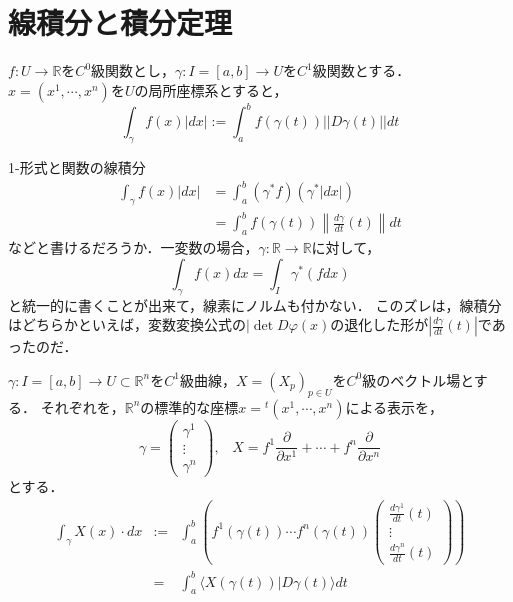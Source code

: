 \documentclass[uplatex, dvipdfmx]{jsreport}
\begin{document}
\section{線積分と積分定理}

\begin{definition}
    $f:U\to\mathbb{R}$を$C^0$級関数とし，$\gamma:I=[a,b]\to U$を$C^1$級関数とする．$x=(x^1,\cdots,x^n)$を$U$の局所座標系とすると，
    \[ \int_\gamma f(x)|dx|:=\int^b_af(\gamma(t))||D\gamma(t)||dt \]
    \begin{center}
    \end{center}
\end{definition}
\begin{itembox}[l]{1-形式と関数の線積分}
    \begin{align*}
        \int_\gamma f(x)|dx| &= \int^b_a(\gamma^*f)(\gamma^*|dx|) \\
        &= \int^b_a f(\gamma(t))\left\| \frac{d\gamma}{dt}(t) \right\|dt
    \end{align*}
    などと書けるだろうか．一変数の場合，$\gamma:\mathbb{R}\to\mathbb{R}$に対して，
    \[ \int_\gamma f(x)dx = \int_I\gamma^*(fdx) \]
    と統一的に書くことが出来て，線素にノルムも付かない．
    このズレは，線積分はどちらかといえば，変数変換公式の$|\det D\varphi(x)$の退化した形が$\left| \frac{d\gamma}{dt}(t) \right|$であったのだ．
\end{itembox}

\begin{definition}[ベクトル場の線積分]
    $\gamma:I=[a,b]\to U\subset\mathbb{R}^n$を$C^1$級曲線，$X=(X_p)_{p\in U}$を$C^0$級のベクトル場とする．
    それぞれを，$\mathbb{R}^n$の標準的な座標$x={}^t(x^1,\cdots,x^n)$による表示を，
    \[ \gamma = \left(\begin{array}{c}\gamma^1 \\ \vdots \\ \gamma^n\end{array}\right), \;\;\; X=f^1\frac{\partial }{\partial x^1}+\cdots +f^n\frac{\partial }{\partial x^n} \]
    とする．
    \begin{eqnarray*}
        \int_\gamma X(x)\cdot dx &:=& \int^b_a \left( f^1(\gamma (t))\cdots f^n(\gamma (t))\left(\begin{array}{c}\frac{d\gamma^1}{dt}(t) \\ \vdots \\ \frac{d\gamma^n}{dt}(t)\end{array}\right) \right) \\
            &=& \int^b_a \langle X(\gamma (t))|D\gamma (t)\rangle dt
    \end{eqnarray*}
\end{definition}
\end{document}
